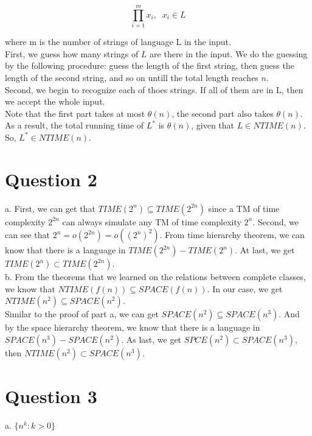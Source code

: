 \documentclass[12pt]{article}
\begin{document}
\begin{equation*}
\prod_{i=1}^m {x_i}, \; \; x_i \in L 
\end{equation*}

where m is the number of strings of language L in the input. \\

First, we guess how many strings of $L$ are there in the input. We do
the guessing by the following procedure: guess the length of the first
string, then guess the length of the second string, and so on untill 
the total length reaches $n$. \\

Second, we begin to recognize each of thoes strings. If all of them
are in L, then we accept the whole input. \\

Note that the first part takes at most $\theta(n)$, the second part
also takes $\theta(n)$. As a result, the total running time of $L^*$
is $\theta(n)$, given that $L \in NTIME(n)$. So, $L^* \in NTIME(n)$.

\section*{Question 2}

a. First, we can get that $TIME(2^n) \subseteq TIME(2^{2n})$ since
a TM of time complexity $2^{2n}$ can always simulate any TM of time
complexity $2^n$. Second, we can see that $2^n = o(2^{2n}) =
o((2^n)^2)$. From time hierarchy theorem, we can know that there is a
language in $TIME(2^{2n}) - TIME(2^n)$. At last, we get $TIME(2^n)
\subset TIME(2^{2n})$. \\

b. From the theorems that we learned on the relations between complete
classes, we know that $NTIME(f(n)) \subseteq SPACE(f(n))$. In our
case, we get $NTIME(n^2) \subseteq SPACE(n^2)$. \\

Similar to the proof of part a, we can get $SPACE(n^2) \subseteq
SPACE(n^3)$. And by the space hierarchy theorem, we know that there is
a language in $SPACE(n^3) - SPACE(n^2)$. As last, we get $SPCE(n^2)
\subset SPACE(n^3)$, then $NTIME(n^2) \subset SPACE(n^3)$.

\section*{Question 3}

a. $\{n^k : k > 0 \}$ \\
\end{document}
